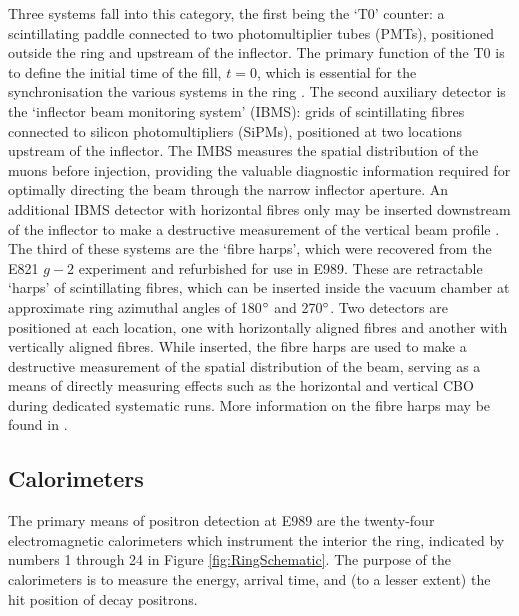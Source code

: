 Three systems fall into this category, the first being the `T0' counter: a scintillating paddle connected to two photomultiplier tubes (PMTs), positioned outside the ring and upstream of the inflector. The primary function of the T0 is to define the initial time of the fill, $t=0$, which is essential for the synchronisation the various systems in the ring \cite{T0}. The second auxiliary detector is the `inflector beam monitoring system' (IBMS): grids of scintillating fibres connected to silicon photomultipliers (SiPMs), positioned at two locations upstream of the inflector. The IMBS measures the spatial distribution of the muons before injection, providing the valuable diagnostic information required for optimally directing the beam through the narrow inflector aperture. An additional IBMS detector with horizontal fibres only may be inserted downstream of the inflector to make a destructive measurement of the vertical beam profile \cite{IBMS}. The third of these systems are the `fibre harps', which were recovered from the E821 $g-2$ experiment and refurbished for use in E989. These are retractable `harps' of scintillating fibres, which can be inserted inside the vacuum chamber at approximate ring azimuthal angles of 180$\degree$ and 270$\degree$. Two detectors are positioned at each location, one with horizontally aligned fibres and another with vertically aligned fibres. While inserted, the fibre harps are used to make a destructive measurement of the spatial distribution of the beam, serving as a means of directly measuring effects such as the horizontal and vertical CBO during dedicated systematic runs. More information on the fibre harps may be found in \cite{TDR}. 

\subsection{Calorimeters}\label{subsec:Calos}

The primary means of positron detection at E989 are the twenty-four electromagnetic calorimeters which instrument the interior the ring, indicated by numbers 1 through 24 in Figure \ref{fig:RingSchematic}. The purpose of the calorimeters is to measure the energy, arrival time, and (to a lesser extent) the hit position of decay positrons.

